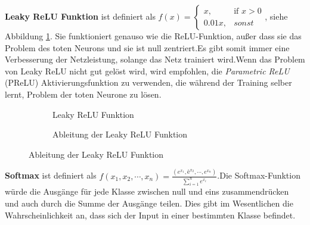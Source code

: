 \documentclass[12pt,a4paper]{scrartcl}
\numberwithin{equation}{section}
\begin{document}
\textbf{Leaky ReLU Funktion} ist definiert als $  f(x)= 
	\begin{cases}
	x,& \text{if } x  >  0\\
	0.01x,              & sonst
	\end{cases} $, siehe Abbildung \ref{fig:LReLU}. Sie funktioniert genauso wie die ReLU-Funktion, außer dass sie das Problem des toten Neurons und sie ist null zentriert.Es gibt somit immer eine Verbesserung der Netzleistung, solange das Netz trainiert wird.Wenn das Problem von Leaky ReLU nicht gut gelöst wird, wird empfohlen, die \textit{Parametric ReLU }(PReLU) Aktivierungsfunktion zu verwenden, die während der Training selber lernt, Problem der toten Neurone zu lösen.
	\begin{figure}[h]
		\caption{Leaky ReLU Funktion}
		\begin{subfigure}{.5\textwidth}
			\centering
			\caption{Leaky ReLU Funktion}
		\end{subfigure}%
		\begin{subfigure}{.5\textwidth}
			\centering
			\caption{Ableitung der Leaky ReLU Funktion}
		\end{subfigure}

		\label{fig:LReLU}
		
	\end{figure}
	
	


\textbf{Softmax} ist definiert als $ f(x_1, x_2, \cdots, x_n) = \frac{(e^{x_1}, ê^{x_2}, \cdots, e^{x_n})}{\sum_{i =1}^{n}{e^{x_i}}} $.Die Softmax-Funktion würde die Ausgänge für jede Klasse zwischen null und eins zusammendrücken und auch durch die Summe der Ausgänge teilen. Dies gibt im Wesentlichen die Wahrscheinlichkeit an, dass sich der Input in einer bestimmten Klasse befindet. 
\end{document}
